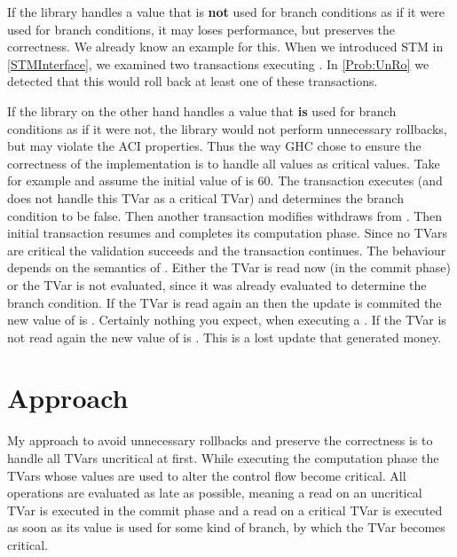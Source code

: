 If the library handles a value that is \textbf{not} used for branch conditions as if it were used for branch conditions, 
it may loses performance, but preserves the correctness. We already know an example for this. When we introduced
STM in \ref{STMInterface}, we examined two transactions executing . In \ref{Prob:UnRo} we detected
that this would roll back at least one of these transactions. 


If the library on the other hand handles a value that \textbf{is}
used for branch conditions as if it were not, the library would not perform unnecessary rollbacks, but may violate 
the ACI properties. Thus the way GHC chose to ensure the correctness of the implementation is to handle all values as 
critical values. Take for example  and assume the initial value of  is 60. 
The transaction executes  (and does not handle this TVar as a critical TVar) and determines the 
branch condition to be false. Then another transaction modifies withdraws  from . Then initial  
transaction resumes and completes its computation phase. Since no TVars are critical the validation succeeds and
the transaction continues. The behaviour depends on the semantics of . Either the TVar is read now
(in the commit phase) or the TVar is not evaluated, since it was already evaluated to determine the branch condition.
If the TVar is read again an then the update is commited the new value of  is . Certainly nothing
you expect, when executing a . If the TVar is not read again the new value of  is
. This is a lost update that generated money. 

\section{Approach}
My approach to avoid unnecessary rollbacks and preserve the correctness is to handle all TVars uncritical at first. 
While executing the computation 
phase the TVars whose values are used to alter the control flow become critical. All  operations are
evaluated as late as possible, meaning a read on an uncritical TVar is executed in the commit phase and a read on 
a critical TVar is executed as soon as its value is used for some kind of branch, by which the TVar becomes critical.

